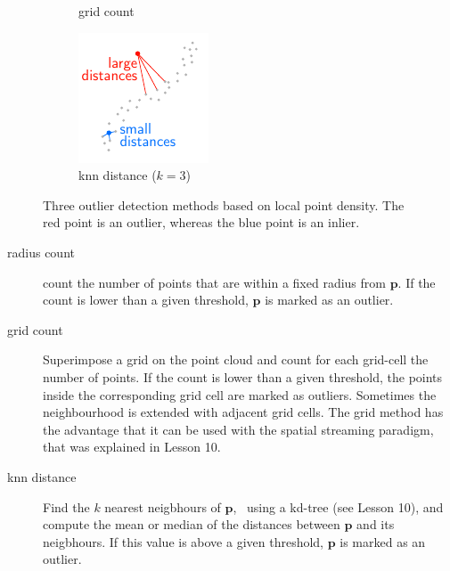 \begin{figure}[htb]
\begin{subfigure}[b]{0.3\linewidth}
    \caption{grid count}
  \end{subfigure}
  \begin{subfigure}[b]{0.3\linewidth}
    \centering
    \includegraphics[width=\textwidth]{figs/knn-distance.pdf}
    \caption{knn distance ($k=3$)}
  \end{subfigure}
\caption{Three outlier detection methods based on local point density. The red point is an outlier, whereas the blue point is an inlier.}
\label{fig:outlier-detection}
\end{figure}

\begin{description}
  \item[radius count] count the number of points that are within a fixed radius from $\mathbf{p}$. If the count is lower than a given threshold, $\mathbf{p}$ is marked as an outlier.
  \item[grid count] Superimpose a grid on the point cloud and count for each grid-cell the number of points. If the count is lower than a given threshold, the points inside the corresponding grid cell are marked as outliers. Sometimes the neighbourhood is extended with adjacent grid cells. The grid method has the advantage that it can be used with the spatial streaming paradigm, that was explained in Lesson 10.
  \item[knn distance] Find the $k$ nearest neigbhours of $\mathbf{p}$, \eg\ using a kd-tree (see Lesson 10), and compute the mean or median of the distances between $\mathbf{p}$ and its neigbhours. If this value is above a given threshold, $\mathbf{p}$ is marked as an outlier.
\end{description}

